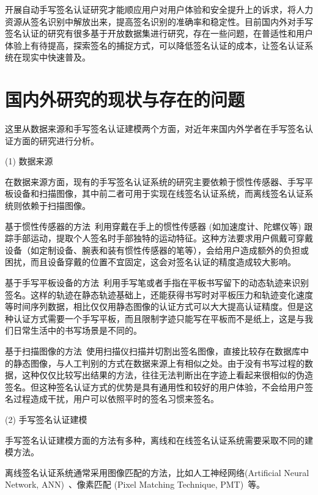 开展自动手写签名认证研究才能顺应用户对用户体验和安全提升上的诉求，将人力资源从签名识别中解放出来，提高签名识别的准确率和稳定性。目前国内外对手写签名认证的研究有很多基于开放数据集进行研究，存在一些问题，在普适性和用户体验上有待提高，探索签名的捕捉方式，可以降低签名认证的成本，让签名认证系统在现实中快速普及。

\section{国内外研究的现状与存在的问题}
这里从数据来源和手写签名认证建模两个方面，对近年来国内外学者在手写签名认证方面的研究进行分析。

(1) 数据来源

在数据来源方面，现有的手写签名认证系统的研究主要依赖于惯性传感器、手写平板设备和扫描图像，其中前二者可用于实现在线签名认证系统，而离线签名认证系统则依赖于扫描图像。

基于惯性传感器的方法~\cite{levy2018handwritten,griswold2019wearables,bunke2011online}利用穿戴在手上的惯性传感器 (如加速度计、陀螺仪等) 跟踪手部运动，提取个人签名时手部独特的运动特征。这种方法要求用户佩戴可穿戴设备（如定制设备、腕表和装有惯性传感器的笔等），会给用户造成额外的负担或困扰，而且设备穿戴的位置不宜固定，这会对签名认证的精度造成较大影响。

基于手写平板设备的方法~\cite{fischer2015robust,kholmatov2005identity,sae2013simple}利用手写笔或者手指在平板书写留下的动态轨迹来识别签名。这样的轨迹在静态轨迹基础上，还能获得书写时对平板压力和轨迹变化速度等时间序列数据，相比仅仅用静态图像的认证方式可以大大提高认证精度。但是这种认证方式需要一个手写平板，而且限制字迹只能写在平板而不是纸上，这是与我们日常生活中的书写场景是不同的。

基于扫描图像的方法~\cite{hafemann2017learning,hafemann2018fixed,ferrer2005offline,kalera2004offline}使用扫描仪扫描并切割出签名图像，直接比较存在数据库中的静态图像，与人工判别的方式在数据来源上有相似之处。由于没有书写过程的数据，这种仅仅比较写出结果的方法，往往无法判断出在字迹上看起来很相似的伪造签名。但这种签名认证方式的优势是具有通用性和较好的用户体验，不会给用户签名过程造成干扰，用户可以依照平时的签名习惯来签名。

(2) 手写签名认证建模

手写签名认证建模方面的方法有多种，离线和在线签名认证系统需要采取不同的建模方法。

离线签名认证系统通常采用图像匹配的方法，比如人工神经网络(Artificial Neural Network, ANN)~\cite{chandra2016offline}、像素匹配 (Pixel Matching Technique, PMT)~\cite{bhattacharya2013offline}等。 

